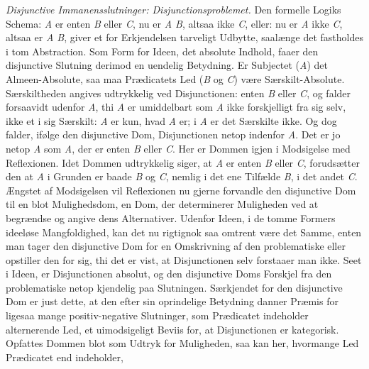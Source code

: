 \documentclass[12pt]{book}
\newcommand{\opage}[1]{\marginnote{\footnotesize\textit{[#1]}}}
\begin{document}
\opage{351}\emph{Disjunctive Immanensslutninger: Disjunctionsproblemet.} Den formelle Logiks Schema: \textit{A} er enten \textit{B} eller \textit{C}, nu er \textit{A B}, altsaa ikke \textit{C}, eller: nu er \textit{A} ikke \textit{C}, altsaa er \textit{A B}, giver et for Erkjendelsen tarveligt Udbytte, saalænge det fastholdes i tom Abstraction. Som Form for Ideen, det absolute Indhold, faaer den disjunctive Slutning derimod en uendelig Betydning. Er Subjectet (\textit{A}) det Almeen-Absolute, saa maa Prædicatets Led (\textit{B} og \textit{C}) være Særskilt-Absolute. Særskiltheden angives udtrykkelig ved Disjunctionen: enten \textit{B} eller \textit{C}, og falder forsaavidt udenfor \textit{A}, thi \textit{A} er umiddelbart som \textit{A} ikke forskjelligt fra sig selv, ikke et i sig Særskilt: \textit{A} er kun, hvad \textit{A} er; i \textit{A} er det Særskilte ikke. Og dog falder, ifølge den disjunctive Dom, Disjunctionen netop indenfor \textit{A}. Det er jo netop \textit{A} som \textit{A}, der er enten \textit{B} eller \textit{C}. Her er Dommen igjen i Modsigelse med Reflexionen. Idet Dommen udtrykkelig siger, at \textit{A} er enten \textit{B} eller \textit{C}, forudsætter den at \textit{A} i Grunden er baade \textit{B} og \textit{C}, nemlig i det ene Tilfælde \textit{B}, i det andet \textit{C}. Ængstet af Modsigelsen vil Reflexionen nu gjerne forvandle den disjunctive Dom til en blot Mulighedsdom, en Dom, der determinerer Muligheden ved at begrændse og angive dens Alternativer. Udenfor Ideen, i de tomme Formers ideeløse Mangfoldighed, kan det nu rigtignok saa omtrent være det Samme, enten man tager den disjunctive Dom for en Omskrivning af den problematiske eller opstiller den for sig, thi det er vist, at Disjunctionen selv forstaaer man ikke. Seet i Ideen, er Disjunctionen absolut, og den disjunctive Doms Forskjel fra den problematiske netop kjendelig paa Slutningen. Særkjendet for den disjunctive Dom er just dette, at den efter sin oprindelige Betydning danner Præmis for ligesaa mange positiv-negative Slutninger, som Prædicatet indeholder alternerende Led, et uimodsigeligt Beviis for, at Disjunctionen er kategorisk. Opfattes Dommen blot som Udtryk for Muligheden, saa kan her, hvormange Led Prædicatet end indeholder,
\end{document}
